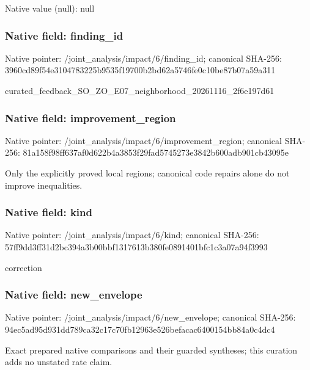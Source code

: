 \documentclass[10pt,a4paper]{article}
\begin{document}
Native value (null): null

\subsubsection{Native field: finding\_\allowbreak{}id}
Native pointer: /joint\_\allowbreak{}analysis/impact/6/finding\_\allowbreak{}id; canonical SHA-256: 3960cd89f54e3104783225b9535f19700b2bd62a5746fe0c10be87b07a59a311

\begingroup\raggedright\sloppy curated\_\allowbreak{}feedback\_\allowbreak{}SO\_\allowbreak{}ZO\_\allowbreak{}E07\_\allowbreak{}neighborhood\_\allowbreak{}20261116\_\allowbreak{}2f6e197d61\par\endgroup

\subsubsection{Native field: improvement\_\allowbreak{}region}
Native pointer: /joint\_\allowbreak{}analysis/impact/6/improvement\_\allowbreak{}region; canonical SHA-256: 81a158f98ff637af0d622b4a3853f29fad5745273e3842b600adb901cb43095e

\begingroup\raggedright\sloppy Only the explicitly proved local regions;\allowbreak{} canonical code repairs alone do not improve inequalities.\par\endgroup

\subsubsection{Native field: kind}
Native pointer: /joint\_\allowbreak{}analysis/impact/6/kind; canonical SHA-256: 57ff9dd3ff31d2bc394a3b00bbf1317613b380fe0891401bfc1c3a07a94f3993

\begingroup\raggedright\sloppy correction\par\endgroup

\subsubsection{Native field: new\_\allowbreak{}envelope}
Native pointer: /joint\_\allowbreak{}analysis/impact/6/new\_\allowbreak{}envelope; canonical SHA-256: 94ec5ad95d931dd789ca32c17c70fb12963e526befacac6400154bb84a0c4dc4

\begingroup\raggedright\sloppy Exact prepared native comparisons and their guarded syntheses;\allowbreak{} this curation adds no unstated rate claim.\par\endgroup
\end{document}
